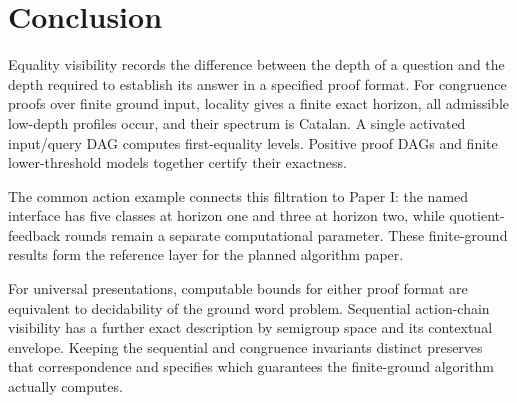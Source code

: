 \section{Conclusion}

Equality visibility records the difference between the depth of a question and the depth required to establish its answer in a specified proof format. For congruence proofs over finite ground input, locality gives a finite exact horizon, all admissible low-depth profiles occur, and their spectrum is Catalan. A single activated input/query DAG computes first-equality levels. Positive proof DAGs and finite lower-threshold models together certify their exactness.

The common action example connects this filtration to Paper I: the named interface has five classes at horizon one and three at horizon two, while quotient-feedback rounds remain a separate computational parameter. These finite-ground results form the reference layer for the planned algorithm paper.

For universal presentations, computable bounds for either proof format are equivalent to decidability of the ground word problem. Sequential action-chain visibility has a further exact description by semigroup space and its contextual envelope. Keeping the sequential and congruence invariants distinct preserves that correspondence and specifies which guarantees the finite-ground algorithm actually computes.

